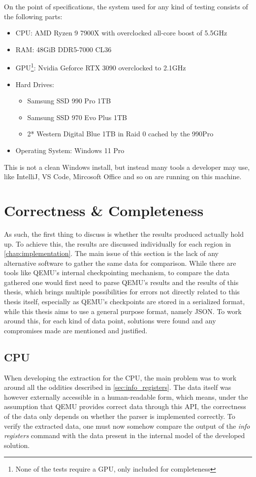 On the point of specifications, the system used for any kind of testing consists of the following parts:
\begin{itemize}
    \item CPU: AMD Ryzen 9 7900X with overclocked all-core boost of 5.5GHz
    \item RAM: 48GiB DDR5-7000 CL36
    \item GPU\footnote{None of the tests require a GPU, only included for completeness}: Nvidia Geforce RTX 3090 overclocked to 2.1GHz
    \item Hard Drives:
    \begin{itemize}
        \item Samsung SSD 990 Pro 1TB
        \item Samsung SSD 970 Evo Plus 1TB
        \item 2* Western Digital Blue 1TB in Raid 0 cached by the 990Pro
    \end{itemize}
    \item Operating System: Windows 11 Pro
\end{itemize}
This is not a clean Windows install, but instead many tools a developer may use,
like IntelliJ, VS Code, Mircosoft Office and so on are running on this machine.

\section{Correctness \& Completeness}
As such, the first thing to discuss is whether the results produced actually hold up.
To achieve this, the results are discussed individually for each region in \autoref{chap:implementation}.
The main issue of this section is the lack of any alternative software to gather the same data for comparison.
While there are tools like QEMU's internal checkpointing mechanism,
to compare the data gathered one would first need to parse QEMU's results and the results of this thesis,
which brings multiple possibilities for errors not directly related to this thesis itself,
especially as QEMU's checkpoints are stored in a serialized format,
while this thesis aims to use a general purpose format, namely JSON.
To work around this, for each kind of data point,
solutions were found and any compromises made are mentioned and justified.

\subsection{CPU}\label{sec:eval_cpu}
When developing the extraction for the CPU,
the main problem was to work around all the oddities described in \autoref{sec:info_registers}.
The data itself was however externally accessible in a human-readable form,
which means, under the assumption that QEMU provides correct data through this API,
the correctness of the data only depends on whether the parser is implemented correctly.
To verify the extracted data, one must now somehow compare the output of the \emph{info registers} command
with the data present in the internal model of the developed solution.

